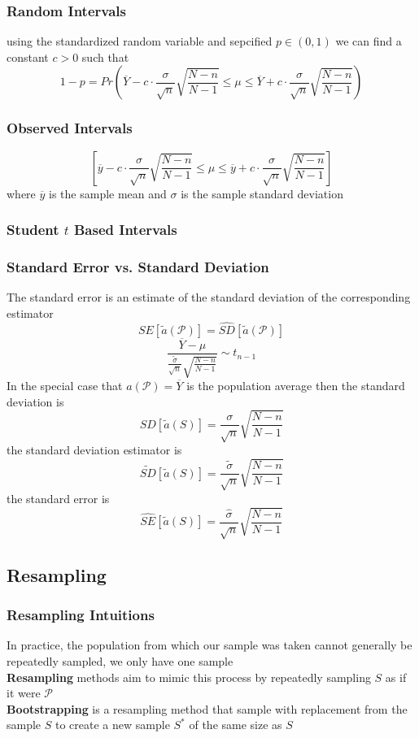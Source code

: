 \documentclass[11pt]{article}
\begin{document}
\subsubsection*{Random Intervals}
using the standardized random variable and sepcified $p\in(0,1)$ we can find a constant $c>0$ such that 
\[1-p = Pr(\overline{Y} - c\cdot \frac{\sigma}{\sqrt{n}}\sqrt{\frac{N-n}{N-1}} \leq \mu \leq \overline{Y} + c\cdot \frac{\sigma}{\sqrt{n}}\sqrt{\frac{N-n}{N-1}})\]
\subsubsection*{Observed Intervals}
\[\left[\overline{y} - c\cdot \frac{\sigma}{\sqrt{n}}\sqrt{\frac{N-n}{N-1}} \leq \mu \leq \overline{y} + c\cdot \frac{\sigma}{\sqrt{n}}\sqrt{\frac{N-n}{N-1}}\right]\]
where $\overline{y}$ is the sample mean and $\sigma$ is the sample standard deviation
\subsubsection{Student $t$ Based Intervals}
\subsubsection*{Standard Error vs. Standard Deviation}
The standard error is an estimate of the standard deviation of the corresponding estimator 
\[SE[\tilde{a}(\mathcal{P})] = \hat{SD}[\tilde{a}(\mathcal{P})]\]
\[\frac{\overline{Y}-\mu}{\frac{\tilde{\sigma}}{\sqrt{n}}\sqrt{\frac{N-n}{N-1}}}\sim t_{n-1}\]
In the special case that $a(\mathcal{P}) = \overline{Y}$ is the population average then the standard deviation is 
\[SD[\tilde{a}(S)] = \frac{\sigma}{\sqrt{n}}\sqrt{\frac{N-n}{N-1}}\]
the standard deviation estimator is 
\[\tilde{SD}[\tilde{a}(S)] = \frac{\tilde{\sigma}}{\sqrt{n}}\sqrt{\frac{N-n}{N-1}}\]
the standard error is 
\[\hat{SE}[\tilde{a}(S)] = \frac{\hat{\sigma}}{\sqrt{n}}\sqrt{\frac{N-n}{N-1}}\]

\subsection{Resampling}
\subsubsection{Resampling Intuitions}
In practice, the population from which our sample was taken cannot generally be repeatedly sampled, we only have one sample \\
\textbf{Resampling} methods aim to mimic this process by repeatedly sampling $S$ as if it were $\mathcal{P}$ \\
\textbf{Bootstrapping} is a resampling method that sample with replacement from the sample $S$ to create a new sample $S^*$ of the same size as $S$ 
\end{document}
